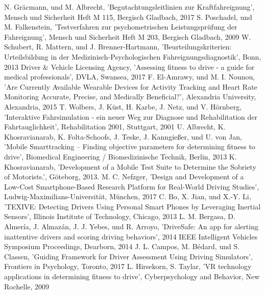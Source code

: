 \documentclass[conference]{IEEEtran}
\begin{document}
\begin{thebibliography}{00}

 N. Gräcmann, und M. Albrecht, 'Begutachtungsleitlinien zur Kraftfahreignung', Mensch und Sicherheit Heft M 115, Bergisch Gladbach, 2017
 S. Poschadel, und M. Falkenstein, 'Testverfahren zur psychometrischen Leistungsprüfung der Fahreignung', Mensch und Sicherheit Heft M 203, Bergisch Gladbach, 2009
 W. Schubert, R. Mattern, und J. Brenner-Hartmann, 'Beurteilungskriterien: Urteilsbildung in der Medizinisch-Psychologischen Fahreignungsdiagnostik', Bonn, 2013
 Driver \& Vehicle Licensing Agency, 'Assessing fitness to drive - a guide for medical professionals', DVLA, Swansea, 2017
 F. El-Amrawy, und M. I. Nounou, 'Are Currently Available Wearable Devices for Activity Tracking and Heart Rate Monitoring Accurate, Precise, and Medically Beneficial?', Alexandria University, Alexandria, 2015
 T. Wolbers, J. Küst, H. Karbe, J. Netz, und V. Hörnberg, 'Interaktive Fahrsimulation - ein neuer Weg zur Diagnose und Rehabilitation der Fahrtauglichkeit', Rehabilitation 2001, Stuttgart, 2001
 U. Albrecht, K. Khosravianarab, K. Folta-Schoofs, J. Teske, J. Kanngießer, und U. von Jan, 'Mobile Smarttracking – Finding objective parameters for determining fitness to drive', Biomedical Engineering / Biomedizinische Technik, Berlin, 2013
K. Khosravianarab, 'Development of a Mobile Test Suite to Determine the Sobriety of Motorists.', Göteborg, 2013.
 M. C. Nefzger, 'Design and Development of a Low-Cost Smartphone-Based Research Platform for Real-World Driving Studies', Ludwig-Maximilians-Universität, München, 2017
 C. Bo, X. Jian, und X.-Y. Li, 'TEXIVE: Detecting Drivers Using Personal Smart Phones
by Leveraging Inertial Sensors',  Illinois Institute of Technology, Chicago, 2013
 L. M. Bergasa, D. Almería, J. Almazán, J. J. Yebes, und R. Arroyo, 'DriveSafe: An app for alerting inattentive drivers and scoring driving behaviors', 2014 IEEE Intelligent Vehicles Symposium Proceedings, Dearborn, 2014
J. L. Campos, M. Bédard, und S. Classen, 'Guiding Framework for Driver Assessment Using Driving Simulators', Frontiers in Psychology, Toronto, 2017
L. Hirsekorn, S. Taylar, 'VR technology applications in determining fitness to drive', Cyberpsychology and Behavior, New Rochelle, 2009

\end{thebibliography}
\end{document}
